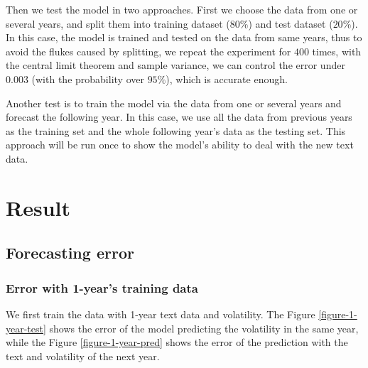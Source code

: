 \documentclass[11pt]{article}
\begin{document}
Then we test the model in two approaches. First we choose the data from one or several years, and split them into training dataset ($80\%$) and test dataset ($20\%$). In this case, the model is trained and tested on the data from same years, thus to avoid the flukes caused by splitting, we repeat the experiment for $400$ times, with the central limit theorem and sample variance, we can control the error under $0.003$ (with the probability over $95\%$), which is accurate enough.

Another test is to train the model via the data from one or several years and forecast the following year. In this case, we use all the data from previous years as the training set and the whole following year's data as the testing set. This approach will be run once to show the model's ability to deal with the new text data.

\section{Result}

\subsection{Forecasting error}

\subsubsection{Error with 1-year's training data}

We first train the data with 1-year text data and volatility. The Figure \ref{figure-1-year-test} shows the error of the model predicting the volatility in the same year, while the Figure \ref{figure-1-year-pred} shows the error of the prediction with the text and volatility of the next year.
\end{document}
